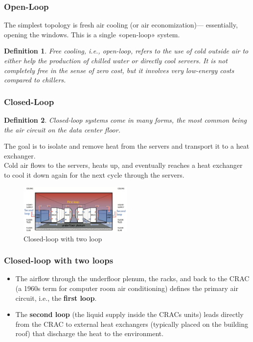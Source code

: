 \documentclass[10pt, oneside]{article}
\newtheorem{defn}{Definition}
\begin{document}
\subsubsection{Open-Loop}
The simplest topology is fresh air cooling (or air economization)— essentially, opening the windows. This is a single «open-loop» system.
\begin{defn}
    Free cooling, i.e., open-loop, refers to the use of cold outside air to either help the production of chilled water or directly cool servers. It is not completely free in the sense of zero cost, but it involves very low-energy costs compared to chillers. 
\end{defn}
\subsubsection{Closed-Loop}
\begin{defn}
    Closed-loop systems come in many forms, the most common being the air circuit on the data center floor.
\end{defn}
The goal is to isolate and remove heat from the servers and transport it to a heat exchanger.\\ Cold air flows to the servers, heats up, and eventually reaches a heat exchanger to cool it down again for the next cycle through the servers.
\begin{multicols}{2}
\begin{figure}[H]
    \begin{center}
    \includegraphics[width=0.5\textwidth]{img/img27.png}
    \caption{Closed-loop with two loop}
    \label{fig:Closed-loop with two loop}
    \end{center}
\end{figure}
\columnbreak
\subsubsection*{Closed-loop with two loops}
\begin{itemize}
    \item The airflow through the underfloor plenum, the racks, and back to the CRAC (a 1960s term for computer room air conditioning) defines the primary air circuit, i.e., the {\bf first loop}.
    \item The {\bf second loop} (the liquid supply inside the CRACs units) leads directly from the CRAC to external heat exchangers (typically placed on the building roof) that discharge the heat to the environment.
\end{itemize}
\end{multicols}
\end{document}
